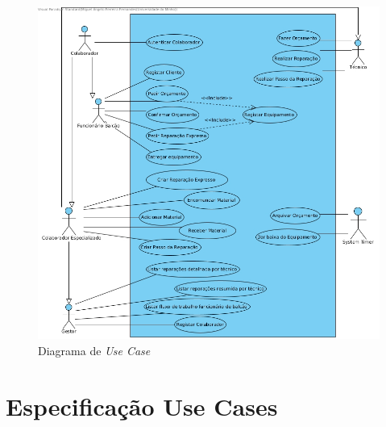 \documentclass[a4paper,12pt]{scrreprt}
\begin{document}
\begin{figure}
    \centering
    \includegraphics[scale=0.45]{dss-usecase.jpg}
    \caption{Diagrama de \textit{Use Case}}
\end{figure}

\section{Especificação Use Cases}
\end{document}
